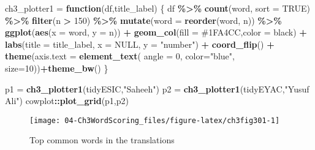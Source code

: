 \documentclass[
]{article}
\newenvironment{Shaded}{\begin{snugshade}}{\end{snugshade}}
\newcommand{\AttributeTok}[1]{\textcolor[rgb]{0.13,0.29,0.53}{#1}}
\newcommand{\ConstantTok}[1]{\textcolor[rgb]{0.56,0.35,0.01}{#1}}
\newcommand{\ControlFlowTok}[1]{\textcolor[rgb]{0.13,0.29,0.53}{\textbf{#1}}}
\newcommand{\DecValTok}[1]{\textcolor[rgb]{0.00,0.00,0.81}{#1}}
\newcommand{\FunctionTok}[1]{\textcolor[rgb]{0.13,0.29,0.53}{\textbf{#1}}}
\newcommand{\NormalTok}[1]{#1}
\newcommand{\OtherTok}[1]{\textcolor[rgb]{0.56,0.35,0.01}{#1}}
\newcommand{\SpecialCharTok}[1]{\textcolor[rgb]{0.81,0.36,0.00}{\textbf{#1}}}
\newcommand{\StringTok}[1]{\textcolor[rgb]{0.31,0.60,0.02}{#1}}
\begin{document}
\begin{Shaded}
\begin{Highlighting}[]
\NormalTok{ch3\_plotter1 }\OtherTok{=} \ControlFlowTok{function}\NormalTok{(df,title\_label) \{}
\NormalTok{      df }\SpecialCharTok{\%\textgreater{}\%} 
      \FunctionTok{count}\NormalTok{(word, }\AttributeTok{sort =} \ConstantTok{TRUE}\NormalTok{) }\SpecialCharTok{\%\textgreater{}\%}
      \FunctionTok{filter}\NormalTok{(n }\SpecialCharTok{\textgreater{}} \DecValTok{150}\NormalTok{) }\SpecialCharTok{\%\textgreater{}\%}
      \FunctionTok{mutate}\NormalTok{(}\AttributeTok{word =} \FunctionTok{reorder}\NormalTok{(word, n)) }\SpecialCharTok{\%\textgreater{}\%}
      \FunctionTok{ggplot}\NormalTok{(}\FunctionTok{aes}\NormalTok{(}\AttributeTok{x =}\NormalTok{ word, }\AttributeTok{y =}\NormalTok{ n)) }\SpecialCharTok{+}
      \FunctionTok{geom\_col}\NormalTok{(}\AttributeTok{fill =} \StringTok{\textquotesingle{}\#1FA4CC\textquotesingle{}}\NormalTok{,}\AttributeTok{color =} \StringTok{\textquotesingle{}black\textquotesingle{}}\NormalTok{) }\SpecialCharTok{+}
      \FunctionTok{labs}\NormalTok{(}\AttributeTok{title =}\NormalTok{ title\_label, }\AttributeTok{x =} \ConstantTok{NULL}\NormalTok{, }\AttributeTok{y =} \StringTok{"number"}\NormalTok{) }\SpecialCharTok{+}
      \FunctionTok{coord\_flip}\NormalTok{() }\SpecialCharTok{+}
      \FunctionTok{theme}\NormalTok{(}\AttributeTok{axis.text =} \FunctionTok{element\_text}\NormalTok{( }
            \AttributeTok{angle =} \DecValTok{0}\NormalTok{, }
            \AttributeTok{color=}\StringTok{"blue"}\NormalTok{, }
            \AttributeTok{size=}\DecValTok{10}\NormalTok{))}\SpecialCharTok{+}\FunctionTok{theme\_bw}\NormalTok{()}
\NormalTok{\}}
\end{Highlighting}
\end{Shaded}

\normalsize

\begin{Shaded}
\begin{Highlighting}[]
\NormalTok{p1 }\OtherTok{=} \FunctionTok{ch3\_plotter1}\NormalTok{(tidyESIC,}\StringTok{"Saheeh"}\NormalTok{)}
\NormalTok{p2 }\OtherTok{=} \FunctionTok{ch3\_plotter1}\NormalTok{(tidyEYAC,}\StringTok{"Yusuf Ali"}\NormalTok{)}
\NormalTok{cowplot}\SpecialCharTok{::}\FunctionTok{plot\_grid}\NormalTok{(p1,p2)}
\end{Highlighting}
\end{Shaded}

\begin{figure}

{\centering \texttt{[image: 04-Ch3WordScoring\_files/figure-latex/ch3fig301-1]} 

}

\caption{Top common words in the translations}\label{fig:ch3fig301}
\end{figure}
\end{document}
